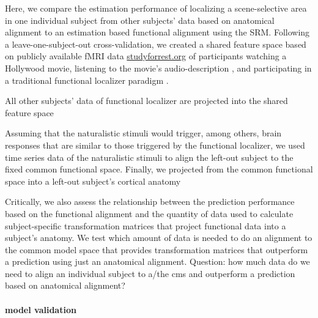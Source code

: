 


Here, we compare the estimation performance of localizing a scene-selective area
in one individual subject from other subjects' data based on anatomical
alignment to an estimation based functional alignment using the \ac{SRM}.
Following a leave-one-subject-out cross-validation, we created a shared feature
space based on publicly available fMRI data
\href{www.studyforrest.org}{studyforrest.org} of participants watching a
Hollywood \citep{hanke2016simultaneous} movie, listening to the movie's
audio-description \citep{hanke2014audiomovie}, and participating in a
traditional functional localizer paradigm \citep{sengupta2016extension}.

All other subjects' data of functional localizer are projected into the shared
feature space

Assuming that the naturalistic stimuli would trigger, among others, brain
responses that are similar to those triggered by the functional localizer, we
used time series data of the naturalistic stimuli to align the left-out subject
to the fixed common functional space.
%
Finally, we projected from the common functional space into a left-out subject's
cortical anatomy

Critically, we also assess the relationship between the prediction performance
based on the functional alignment and the quantity of data used to calculate
subject-specific transformation matrices that project functional data into a
subject's anatomy.
%
We test which amount of data is needed to do an alignment to the common model
space that provides transformation matrices that outperform a prediction using
just an anatomical alignment.
%
Question: how much data do we need to align an individual subject to a/the
\ac{cms} and outperform a prediction based on anatomical alignment?


\paragraph{model validation}

